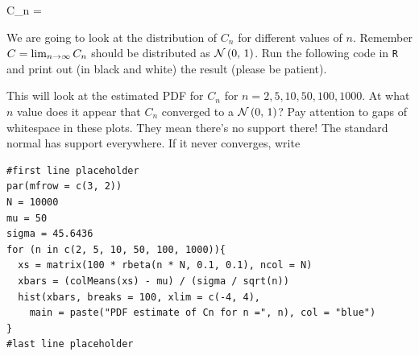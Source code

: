 \documentclass[12pt]{article}
\begin{document}
\begin{enumerate}
{\beqn
C_n =  
\eeqn

We are going to look at the distribution of $C_n$ for different values of $n$. Remember $C = \lim_{n \rightarrow \infty} C_n$ should be distributed as $\mathcal{N}\left(0,\,1\right)$. Run the following code in \texttt{R} and print out (in black and white) the result (please be patient).

This will look at the estimated PDF for $C_n$ for $n = 2, 5, 10, 50, 100, 1000$. At what $n$ value does it appear that $C_n$ converged to a $\mathcal{N}\left(0,\,1\right)$? Pay attention to gaps of whitespace in these plots. They mean there's no support there! The standard normal has support everywhere. If it never converges, write  }

\begin{verbatim}
#first line placeholder
par(mfrow = c(3, 2))
N = 10000
mu = 50
sigma = 45.6436
for (n in c(2, 5, 10, 50, 100, 1000)){
  xs = matrix(100 * rbeta(n * N, 0.1, 0.1), ncol = N)
  xbars = (colMeans(xs) - mu) / (sigma / sqrt(n))
  hist(xbars, breaks = 100, xlim = c(-4, 4), 
    main = paste("PDF estimate of Cn for n =", n), col = "blue")
}
#last line placeholder
\end{verbatim}~

 

\end{enumerate}


\begin{enumerate}





\end{enumerate}
\end{document}
